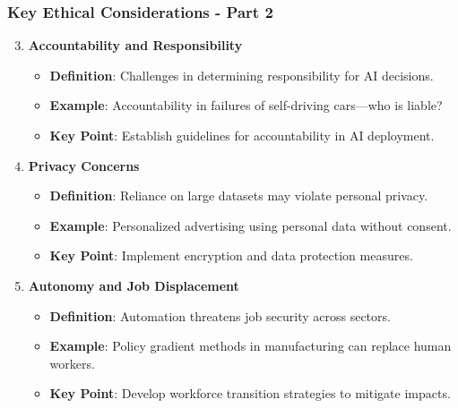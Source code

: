 \documentclass[aspectratio=169]{beamer}
\begin{document}
\begin{frame}[fragile]
    \frametitle{Key Ethical Considerations - Part 2}
    \begin{enumerate}
        \setcounter{enumi}{2} %
        \item \textbf{Accountability and Responsibility}
            \begin{itemize}
                \item \textbf{Definition}: Challenges in determining responsibility for AI decisions.
                \item \textbf{Example}: Accountability in failures of self-driving cars—who is liable?
                \item \textbf{Key Point}: Establish guidelines for accountability in AI deployment.
            \end{itemize}

        \item \textbf{Privacy Concerns}
            \begin{itemize}
                \item \textbf{Definition}: Reliance on large datasets may violate personal privacy.
                \item \textbf{Example}: Personalized advertising using personal data without consent.
                \item \textbf{Key Point}: Implement encryption and data protection measures.
            \end{itemize}

        \item \textbf{Autonomy and Job Displacement}
            \begin{itemize}
                \item \textbf{Definition}: Automation threatens job security across sectors.
                \item \textbf{Example}: Policy gradient methods in manufacturing can replace human workers.
                \item \textbf{Key Point}: Develop workforce transition strategies to mitigate impacts.
            \end{itemize}
    \end{enumerate}
\end{frame}
\end{document}
